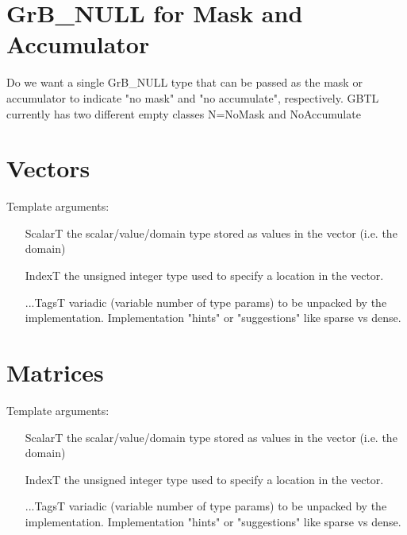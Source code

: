 \section{{\sf GrB\_NULL} for Mask and Accumulator}
\label{Sec:NoMaskNoAccum}

Do we want a single GrB\_NULL type that can be passed as the mask or accumulator 
to indicate "no mask" and "no accumulate", respectively.  GBTL currently has two
different empty classes N={\sf NoMask} and {\sf NoAccumulate}

\section{Vectors}
\label{Sec:Vectors}

Template arguments:
\begin{itemize}[leftmargin=1.1in]
\item[ScalarT]  the scalar/value/domain type stored as values in the vector (i.e. the domain)
\item[IndexT]   the unsigned integer type used to specify a location in the vector.
\item[...TagsT] variadic (variable number of type params) to be unpacked by the implementation.
Implementation "hints" or "suggestions" like sparse vs dense.
\end{itemize}

\section{Matrices}
\label{Sec:Matrices}


Template arguments:
\begin{itemize}[leftmargin=1.1in]
\item[ScalarT]  the scalar/value/domain type stored as values in the vector (i.e. the domain)
\item[IndexT]   the unsigned integer type used to specify a location in the vector.
\item[...TagsT] variadic (variable number of type params) to be unpacked by the implementation.
Implementation "hints" or "suggestions" like sparse vs dense.
\end{itemize}

